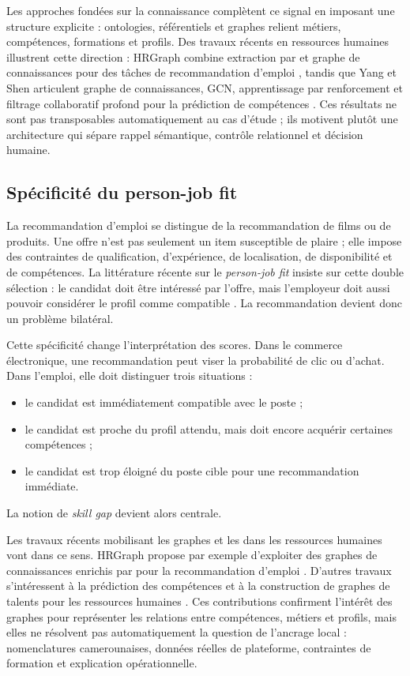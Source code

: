 Les approches fondées sur la connaissance complètent ce signal en imposant une structure explicite : ontologies, référentiels et graphes relient métiers, compétences, formations et profils. Des travaux récents en ressources humaines illustrent cette direction : HRGraph combine extraction par \LLM{} et graphe de connaissances pour des tâches de recommandation d'emploi \cite{wasi2024hrgraph}, tandis que Yang et Shen articulent graphe de connaissances, GCN, apprentissage par renforcement et filtrage collaboratif profond pour la prédiction de compétences \cite{yang2025talentgraph}. Ces résultats ne sont pas transposables automatiquement au cas d'étude ; ils motivent plutôt une architecture qui sépare rappel sémantique, contrôle relationnel et décision humaine.
\subsection{Spécificité du person-job fit}

La recommandation d'emploi se distingue de la recommandation de films ou de produits. Une offre n'est pas seulement un item susceptible de plaire ; elle impose des contraintes de qualification, d'expérience, de localisation, de disponibilité et de compétences. La littérature récente sur le \emph{person-job fit} insiste sur cette double sélection : le candidat doit être intéressé par l'offre, mais l'employeur doit aussi pouvoir considérer le profil comme compatible \cite{yang2022twoway}. La recommandation devient donc un problème bilatéral.

Cette spécificité change l'interprétation des scores. Dans le commerce électronique, une recommandation peut viser la probabilité de clic ou d'achat. Dans l'emploi, elle doit distinguer trois situations :
\begin{itemize}
    \item le candidat est immédiatement compatible avec le poste ;
    \item le candidat est proche du profil attendu, mais doit encore acquérir certaines compétences ;
    \item le candidat est trop éloigné du poste cible pour une recommandation immédiate.
\end{itemize}
La notion de \emph{skill gap} devient alors centrale.

Les travaux récents mobilisant les graphes et les \LLM{} dans les ressources humaines vont dans ce sens. HRGraph propose par exemple d'exploiter des graphes de connaissances enrichis par \LLM{} pour la recommandation d'emploi \cite{wasi2024hrgraph}. D'autres travaux s'intéressent à la prédiction des compétences et à la construction de graphes de talents pour les ressources humaines \cite{yang2025talentgraph}. Ces contributions confirment l'intérêt des graphes pour représenter les relations entre compétences, métiers et profils, mais elles ne résolvent pas automatiquement la question de l'ancrage local : nomenclatures camerounaises, données réelles de plateforme, contraintes de formation et explication opérationnelle.

